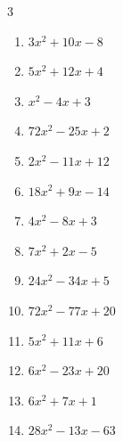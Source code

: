 \begin{multicols}{3}
\begin{enumerate}
  \item $3x^{2}+10x-8$

        \phantom{$=(3x-2)(x+4)$}

  \item $5x^{2}+12x+4$

        \phantom{$=(5x+2)(x+2)$}

  \item $x^{2}-4x+3$

        \phantom{$=(x-1)(x-3)$}

  \item $72x^{2}-25x+2$

        \phantom{$=(8x-1)(9x-2)$}

  \item $2x^{2}-11x+12$

        \phantom{$=(x-4)(2x-3)$}

  \item $18x^{2}+9x-14$

        \phantom{$=(3x-2)(6x+7)$}

  \item $4x^{2}-8x+3$

        \phantom{$=(2x-3)(2x-1)$}

\columnbreak %

\resetques

  \item $7x^{2}+2x-5$

        \phantom{$=(7x-5)(x+1)$}

  \item $24x^{2}-34x+5$

        \phantom{$=(4x-5)(6x-1)$}

  \item $72x^{2}-77x+20$

        \phantom{$=(9x-4)(8x-5)$}

  \item $5x^{2}+11x+6$

        \phantom{$=(5x+6)(x+1)$}

  \item $6x^{2}-23x+20$

        \phantom{$=(2x-5)(3x-4)$}

  \item $6x^{2}+7x+1$

        \phantom{$=(6x+1)(x+1)$}

  \item $28x^{2}-13x-63$

        \phantom{$=(4x-7)(7x+9)$}


\end{enumerate}
\end{multicols}

